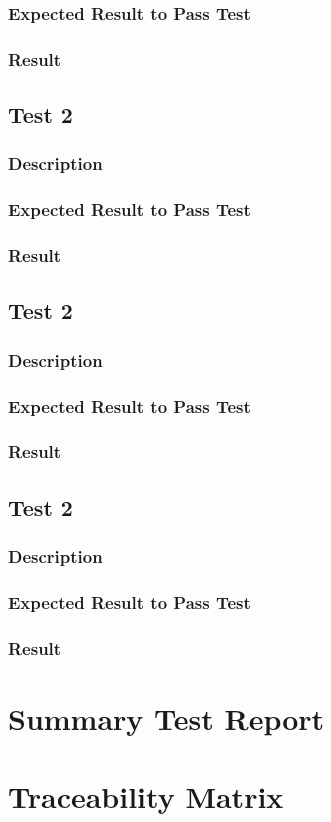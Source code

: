 \documentclass[11pt]{article}
\begin{document}
\subsubsection{Expected Result to Pass Test}
\subsubsection{Result}

\subsection{Test 2}
\subsubsection{Description}
\subsubsection{Expected Result to Pass Test}
\subsubsection{Result}

\subsection{Test 2}
\subsubsection{Description}
\subsubsection{Expected Result to Pass Test}
\subsubsection{Result}

\subsection{Test 2}
\subsubsection{Description}
\subsubsection{Expected Result to Pass Test}
\subsubsection{Result}

\section{Summary Test Report}

\section{Traceability Matrix}
\end{document}
